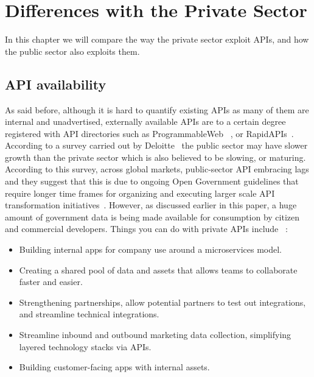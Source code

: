\chapter{Differences with the Private Sector}

\ifpdf
    \graphicspath{{Chapter3/Figs/Raster/}{Chapter3/Figs/PDF/}{Chapter3/Figs/}}
\else
    \graphicspath{{Chapter3/Figs/Vector/}{Chapter3/Figs/}}
\fi

In this chapter we will compare the way the
private sector exploit APIs, and how the public sector also exploits them.

\section{API availability}

As said before, although it is hard to quantify existing APIs
as many of them are internal and unadvertised, externally available
APIs are to a certain degree registered with API directories such as ProgrammableWeb
~\citep{programmableweb_apis}, or RapidAPIs~\citep{rapid_apis}. According to a survey carried out by Deloitte~\citep{deloitte_insights} the public sector may have slower growth than the private
sector which is also believed to be slowing, or maturing. According to
this survey, across global markets, public-sector API embracing lags and they
suggest that this is due to ongoing Open Government guidelines that
require longer time frames for organizing and executing larger scale API
transformation initiatives~\citep{deloitte_insights}. However, as discussed earlier in this
paper, a huge amount of government data is being made available for
consumption by citizen and commercial developers. Things you can 
do with private APIs include ~\citep{upwork}:

\begin{itemize}
	\item Building internal apps for company use around a microservices model.
	\item Creating a shared pool of data and assets that allows teams to collaborate faster and easier.
	\item Strengthening partnerships, allow potential partners to test out integrations, and streamline technical integrations.
	\item Streamline inbound and outbound marketing data collection, simplifying layered technology stacks via APIs.
	\item Building customer-facing apps with internal assets.
\end{itemize}


